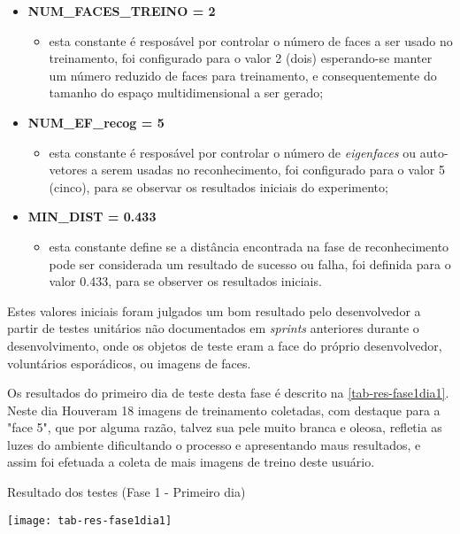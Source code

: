 \begin{itemize}	
	\item \textbf{NUM\_FACES\_TREINO = 2}
	\begin{itemize}	
		\item esta constante é resposável por controlar o número de faces a ser usado no treinamento, foi configurado para o valor 2 (dois) esperando-se manter um número reduzido de faces para treinamento, e consequentemente do tamanho do espaço multidimensional a ser gerado;
	\end{itemize}

	\item \textbf{NUM\_EF\_recog = 5}
	\begin{itemize}	
		\item esta constante é resposável por controlar o número de \textit{eigenfaces} ou auto-vetores a serem usadas no reconhecimento, foi configurado para o valor 5 (cinco), para se observar os resultados iniciais do experimento;
	\end{itemize}

	\item \textbf{MIN\_DIST = 0.433}
	\begin{itemize}	
		\item esta constante define se a distância encontrada na fase de reconhecimento pode ser considerada um resultado de sucesso ou falha, foi definida para o valor 0.433, para se observer os resultados iniciais.
	\end{itemize}
\end{itemize}

Estes valores iniciais foram julgados um bom resultado pelo desenvolvedor a partir de testes unitários não documentados em \textit{sprints} anteriores durante o desenvolvimento, onde os objetos de teste eram a face do próprio desenvolvedor, voluntários esporádicos, ou imagens de faces.

Os resultados do primeiro dia de teste desta fase é descrito na \autoref{tab-res-fase1dia1}. Neste dia Houveram 18 imagens de treinamento coletadas, com destaque para a "face 5", que por alguma razão, talvez sua pele muito branca e oleosa, refletia as luzes do ambiente dificultando o processo e apresentando maus resultados, e assim foi efetuada a coleta de mais imagens de treino deste usuário.

\begin{table}[h]
	\centering
	\caption{Resultado dos testes (Fase 1 - Primeiro dia) }
	\texttt{[image: tab-res-fase1dia1]}
	\label{tab-res-fase1dia1}
\end{table}

